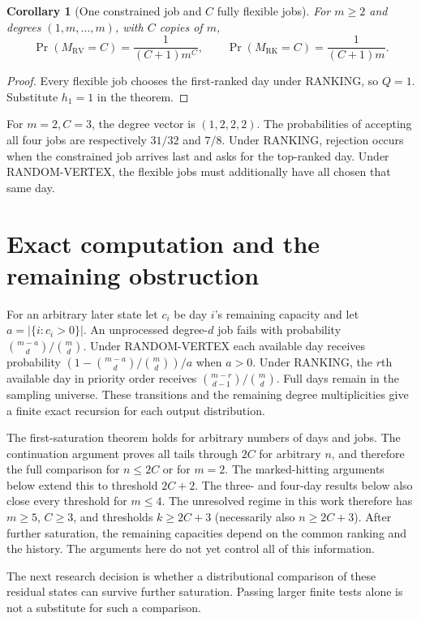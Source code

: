 \documentclass[11pt]{article}
\newtheorem{corollary}{Corollary}
\newcommand{\RV}{\mathrm{RV}}
\newcommand{\RK}{\mathrm{RK}}
\begin{document}
\begin{corollary}[One constrained job and $C$ fully flexible jobs]
For $m\geq2$ and degrees $(1,m,\ldots,m)$, with $C$ copies of $m$,
\[
 \Pr(M_\RV=C)=\frac{1}{(C+1)m^C},\qquad
 \Pr(M_\RK=C)=\frac{1}{(C+1)m}.
\]
\end{corollary}
\begin{proof}
Every flexible job chooses the first-ranked day under RANKING, so
$Q=1$. Substitute $h_1=1$ in the theorem.
\end{proof}

For $m=2,C=3$, the degree vector is $(1,2,2,2)$.
The probabilities of accepting all four jobs are respectively
$31/32$ and $7/8$. Under RANKING, rejection occurs when the constrained
job arrives last and asks for the top-ranked day. Under RANDOM-VERTEX,
the flexible jobs must additionally have all chosen that same day.

\section{Exact computation and the remaining obstruction}
For an arbitrary later state let $c_i$ be day $i$'s remaining capacity
and let $a=|\{i:c_i>0\}|$. An unprocessed degree-$d$ job fails with
probability $\binom{m-a}{d}/\binom md$. Under RANDOM-VERTEX each available
day receives probability $(1-\binom{m-a}{d}/\binom md)/a$ when $a>0$.
Under RANKING, the $r$th available day in priority order receives
$\binom{m-r}{d-1}/\binom md$. Full days remain in the sampling universe.
These transitions and the remaining degree multiplicities give a finite
exact recursion for each output distribution.

The first-saturation theorem holds for arbitrary numbers of days and jobs.
The continuation argument proves all tails through $2C$ for arbitrary $n$,
and therefore the full comparison for $n\leq2C$ or for $m=2$.
The marked-hitting arguments below extend this to threshold $2C+2$.
The three- and four-day results below also close every threshold for $m\leq4$.
The unresolved regime in this work therefore has $m\geq5$, $C\geq3$,
and thresholds $k\geq2C+3$ (necessarily also $n\geq2C+3$).
After further saturation, the remaining capacities depend on the common
ranking and the history. The arguments here do not yet control all of
this information.

The next research decision is whether a distributional comparison of
these residual states can survive further saturation. Passing larger
finite tests alone is not a substitute for such a comparison.
\end{document}
